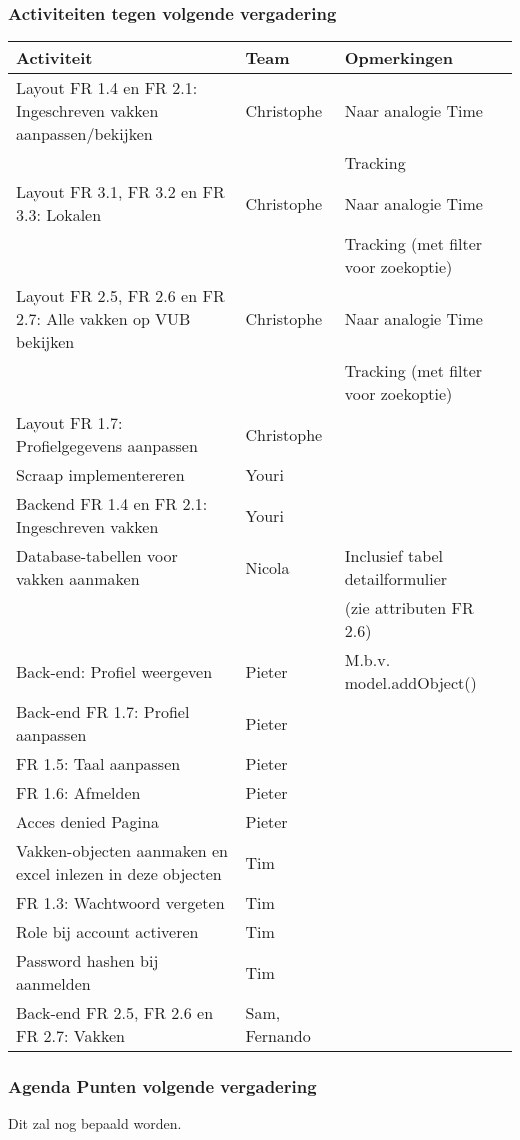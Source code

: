 \subsubsection{Activiteiten tegen volgende vergadering} \label{sec:TODOActiviteiten}
\begin{table} [H]
	\centering
	\begin{tabular} {l|l|l}
		\textbf{Activiteit} & \textbf{Team} & \textbf{Opmerkingen} \\
		\hline
		Layout FR 1.4 en FR 2.1: Ingeschreven vakken aanpassen/bekijken & Christophe & Naar analogie Time \\
		& & Tracking\\
		Layout FR 3.1, FR 3.2 en FR 3.3: Lokalen & Christophe & Naar analogie Time \\
		& & Tracking (met filter voor zoekoptie) \\
		Layout FR 2.5, FR 2.6 en FR 2.7: Alle vakken op VUB bekijken & Christophe & Naar analogie Time \\
		& & Tracking (met filter voor zoekoptie) \\
		Layout FR 1.7: Profielgegevens aanpassen & Christophe & \\
		Scraap implementereren & Youri & \\
		Backend FR 1.4 en FR 2.1: Ingeschreven vakken & Youri & \\
		Database-tabellen voor vakken aanmaken & Nicola & Inclusief tabel detailformulier \\
		& & (zie attributen FR 2.6) \\
		Back-end: Profiel weergeven & Pieter & M.b.v. model.addObject() \\
		Back-end FR 1.7: Profiel aanpassen & Pieter & \\
		FR 1.5: Taal aanpassen & Pieter & \\
		FR 1.6: Afmelden & Pieter & \\
		Acces denied Pagina & Pieter & \\
		Vakken-objecten aanmaken  en excel inlezen in deze objecten & Tim & \\
		FR 1.3: Wachtwoord vergeten & Tim & \\
		Role bij account activeren & Tim & \\
		Password hashen bij aanmelden & Tim & \\
		Back-end FR 2.5, FR 2.6 en FR 2.7: Vakken & Sam, Fernando & \\
	\end{tabular}
\end{table}

\subsubsection{Agenda Punten volgende vergadering}
Dit zal nog bepaald worden.